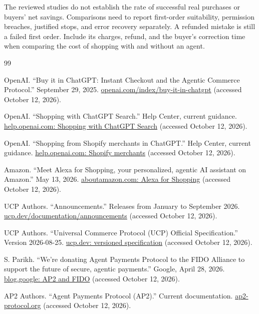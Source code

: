 \documentclass{article}
\begin{document}
The reviewed studies do not establish the rate of successful real purchases or buyers' net savings. Comparisons need to report first-order suitability, permission breaches, justified stops, and error recovery separately. A refunded mistake is still a failed first order. Include its charges, refund, and the buyer's correction time when comparing the cost of shopping with and without an agent.
\clearpage
\begingroup
\small
\begin{thebibliography}{99}
\raggedright
{}
OpenAI. ``Buy it in ChatGPT: Instant Checkout and the Agentic Commerce Protocol.'' September 29, 2025. \href{https://openai.com/index/buy-it-in-chatgpt/}{openai.com/index/buy-it-in-chatgpt} (accessed October 12, 2026).

OpenAI. ``Shopping with ChatGPT Search.'' Help Center, current guidance. \href{https://help.openai.com/en/articles/11128490-shopping-with-chatgpt-search}{help.openai.com: Shopping with ChatGPT Search} (accessed October 12, 2026).

OpenAI. ``Shopping from Shopify merchants in ChatGPT.'' Help Center, current guidance. \href{https://help.openai.com/en/articles/20001241-shopping-from-shopify-merchants-in-chatgpt}{help.openai.com: Shopify merchants} (accessed October 12, 2026).

Amazon. ``Meet Alexa for Shopping, your personalized, agentic AI assistant on Amazon.'' May 13, 2026. \href{https://www.aboutamazon.com/news/retail/alexa-for-shopping-ai-assistant}{aboutamazon.com: Alexa for Shopping} (accessed October 12, 2026).

UCP Authors. ``Announcements.'' Releases from January to September 2026. \href{https://ucp.dev/documentation/announcements/}{ucp.dev/documentation/announcements} (accessed October 12, 2026).

UCP Authors. ``Universal Commerce Protocol (UCP) Official Specification.'' Version 2026-08-25. \href{https://ucp.dev/2026-08-25/specification/overview/}{ucp.dev: versioned specification} (accessed October 12, 2026).

S. Parikh. ``We're donating Agent Payments Protocol to the FIDO Alliance to support the future of secure, agentic payments.'' Google, April 28, 2026. \href{https://blog.google/products-and-platforms/platforms/google-pay/agent-payments-protocol-fido-alliance/}{blog.google: AP2 and FIDO} (accessed October 12, 2026).

AP2 Authors. ``Agent Payments Protocol (AP2).'' Current documentation. \href{https://ap2-protocol.org/}{ap2-protocol.org} (accessed October 12, 2026).


\end{thebibliography}
\end{document}
